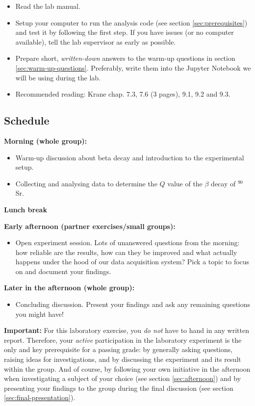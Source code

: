 \documentclass[a4,11pt, notitlepage]{article}
\begin{document}
\begin{itemize}
  
\item Read the lab manual.
\item Setup your computer to run the analysis code (see section \ref{sec:prerequisites})
  and test it by following the first step. If you have issues (or no computer
  available), tell the lab supervisor as early as possible.
\item Prepare short, \emph{written-down} answers to the warm-up questions in
  section \ref{sec:warm-up-questions}. Preferably, write them into the Jupyter
  Notebook we will be using during the lab.
\item Recommended reading: Krane chap. 7.3, 7.6 (3 pages), 9.1, 9.2 and 9.3.
\end{itemize}



\subsection{Schedule}

\noindent\textbf{Morning (whole group):} 
\begin{itemize}
\item Warm-up discussion about beta decay and introduction to the
  experimental setup.
\item Collecting and analysing data to determine the $Q$ value of the
  $\beta$ decay of $^{90}$Sr.
\end{itemize}

\noindent\textbf{Lunch break} 

\noindent\textbf{Early afternoon (partner exercises/small groups):} 
\begin{itemize}
\item Open experiment session. Lots of unanswered questions from the
  morning: how reliable are the results, how can they be improved and
  what actually happens under the hood of our data acquisition system?
  Pick a topic to focus on and document your findings.
\end{itemize}

\noindent\textbf{Later in the afternoon (whole group):} 
\begin{itemize}
\item Concluding discussion. Present your findings and ask any
  remaining questions you might have!
\end{itemize}


\textbf{Important: }For this laboratory exercise, you \emph{do not} have to hand in any
written report. Therefore, your \emph{active} participation in the laboratory experiment is
the only and key prerequisite for a passing grade: by generally asking questions,
raising ideas for investigations, and by discussing the experiment and
its result within the group. And of course, by following your own
initiative in the afternoon when investigating a subject of your
choice (see section \ref{sec:afternoon}) and by presenting your
findings to the group during the final discussion (see section
\ref{sec:final-presentation}).
\end{document}

